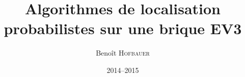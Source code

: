 \documentclass[12pt,a4paper]{./../../template/memoire-umons}
\title{Algorithmes de localisation probabilistes sur une brique EV3}
\author{Beno\^it \textsc{Hofbauer}}
\date{2014--2015}
\begin{document}
\begin{preface}

\end{preface}


\tableofcontents
\listoffigures

%








\end{document}
